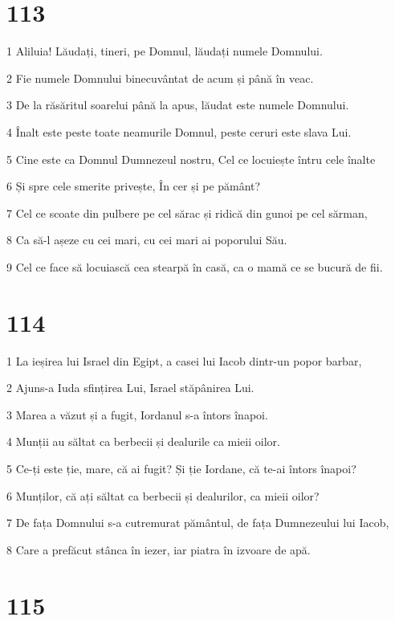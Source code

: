 \chapter{113}

\par 1 Aliluia! Lăudați, tineri, pe Domnul, lăudați numele Domnului.
\par 2 Fie numele Domnului binecuvântat de acum și până în veac.
\par 3 De la răsăritul soarelui până la apus, lăudat este numele Domnului.
\par 4 Înalt este peste toate neamurile Domnul, peste ceruri este slava Lui.
\par 5 Cine este ca Domnul Dumnezeul nostru, Cel ce locuiește întru cele înalte
\par 6 Și spre cele smerite privește, În cer și pe pământ?
\par 7 Cel ce scoate din pulbere pe cel sărac și ridică din gunoi pe cel sărman,
\par 8 Ca să-l așeze cu cei mari, cu cei mari ai poporului Său.
\par 9 Cel ce face să locuiască cea stearpă în casă, ca o mamă ce se bucură de fii.

\chapter{114}

\par 1 La ieșirea lui Israel din Egipt, a casei lui Iacob dintr-un popor barbar,
\par 2 Ajuns-a Iuda sfințirea Lui, Israel stăpânirea Lui.
\par 3 Marea a văzut și a fugit, Iordanul s-a întors înapoi.
\par 4 Munții au săltat ca berbecii și dealurile ca mieii oilor.
\par 5 Ce-ți este ție, mare, că ai fugit? Și ție Iordane, că te-ai întors înapoi?
\par 6 Munților, că ați săltat ca berbecii și dealurilor, ca mieii oilor?
\par 7 De fața Domnului s-a cutremurat pământul, de fața Dumnezeului lui Iacob,
\par 8 Care a prefăcut stânca în iezer, iar piatra în izvoare de apă.

\chapter{115}

